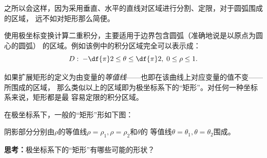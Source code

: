 之所以会这样，因为采用垂直、水平的直线对区域进行分割、定限，对于圆弧围成的区域，
远不如对矩形那么简便。

使用极坐标变换计算二重积分，主要适用于边界包含圆弧（准确地说是以原点为圆心的圆弧）
的区域。例如该例中的积分区域完全可以表示成：
$$D:\;-\df{\pi}2\leq\theta\leq\df{\pi}2,
\;0\leq\rho\leq1.$$

如果扩展矩形的定义为由变量的{\it 等值线}——也即在该曲线上对应变量的值不变——所围成的区域，
那么类似以上的区域即为极坐标系下的“矩形”。对任何一种坐标系来说，矩形都是最
容易定限的积分区域。

在极坐标系下，一般的“矩形”形如下图：
\begin{center}
\end{center}

阴影部分分别由$\rho$的等值线$\rho=\rho_1,\rho=\rho_2$和$\theta$的
等值线$\theta=\theta_1,\theta=\theta_2$围成。

{\bf 思考：}极坐标系下的“矩形”有哪些可能的形状？


